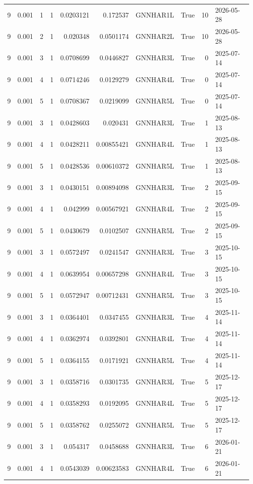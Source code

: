 \begin{tabular}{rrrrrrlrrl}
9 & 0.001 & 1 & 1 & 0.0203121 & 0.172537 & GNNHAR1L & True & 10 & 2026-05-28 \\
9 & 0.001 & 2 & 1 & 0.020348 & 0.0501174 & GNNHAR2L & True & 10 & 2026-05-28 \\
9 & 0.001 & 3 & 1 & 0.0708699 & 0.0446827 & GNNHAR3L & True & 0 & 2025-07-14 \\
9 & 0.001 & 4 & 1 & 0.0714246 & 0.0129279 & GNNHAR4L & True & 0 & 2025-07-14 \\
9 & 0.001 & 5 & 1 & 0.0708367 & 0.0219099 & GNNHAR5L & True & 0 & 2025-07-14 \\
9 & 0.001 & 3 & 1 & 0.0428603 & 0.020431 & GNNHAR3L & True & 1 & 2025-08-13 \\
9 & 0.001 & 4 & 1 & 0.0428211 & 0.00855421 & GNNHAR4L & True & 1 & 2025-08-13 \\
9 & 0.001 & 5 & 1 & 0.0428536 & 0.00610372 & GNNHAR5L & True & 1 & 2025-08-13 \\
9 & 0.001 & 3 & 1 & 0.0430151 & 0.00894098 & GNNHAR3L & True & 2 & 2025-09-15 \\
9 & 0.001 & 4 & 1 & 0.042999 & 0.00567921 & GNNHAR4L & True & 2 & 2025-09-15 \\
9 & 0.001 & 5 & 1 & 0.0430679 & 0.0102507 & GNNHAR5L & True & 2 & 2025-09-15 \\
9 & 0.001 & 3 & 1 & 0.0572497 & 0.0241547 & GNNHAR3L & True & 3 & 2025-10-15 \\
9 & 0.001 & 4 & 1 & 0.0639954 & 0.00657298 & GNNHAR4L & True & 3 & 2025-10-15 \\
9 & 0.001 & 5 & 1 & 0.0572947 & 0.00712431 & GNNHAR5L & True & 3 & 2025-10-15 \\
9 & 0.001 & 3 & 1 & 0.0364401 & 0.0347455 & GNNHAR3L & True & 4 & 2025-11-14 \\
9 & 0.001 & 4 & 1 & 0.0362974 & 0.0392801 & GNNHAR4L & True & 4 & 2025-11-14 \\
9 & 0.001 & 5 & 1 & 0.0364155 & 0.0171921 & GNNHAR5L & True & 4 & 2025-11-14 \\
9 & 0.001 & 3 & 1 & 0.0358716 & 0.0301735 & GNNHAR3L & True & 5 & 2025-12-17 \\
9 & 0.001 & 4 & 1 & 0.0358293 & 0.0192095 & GNNHAR4L & True & 5 & 2025-12-17 \\
9 & 0.001 & 5 & 1 & 0.0358762 & 0.0255072 & GNNHAR5L & True & 5 & 2025-12-17 \\
9 & 0.001 & 3 & 1 & 0.054317 & 0.0458688 & GNNHAR3L & True & 6 & 2026-01-21 \\
9 & 0.001 & 4 & 1 & 0.0543039 & 0.00623583 & GNNHAR4L & True & 6 & 2026-01-21 \\

\end{tabular}
